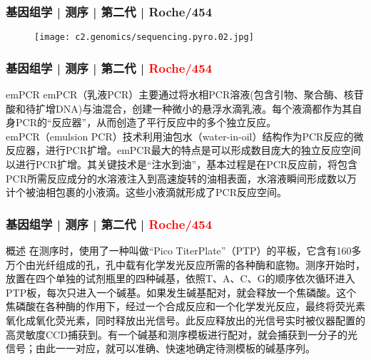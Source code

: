 \begin{frame}
  \frametitle{基因组学 | 测序 | 第二代 | Roche/454}
  \begin{figure}
    \centering
    \texttt{[image: c2.genomics/sequencing.pyro.02.jpg]}
  \end{figure}
\end{frame}

\begin{frame}
  \frametitle{基因组学 | 测序 | 第二代 | \textcolor{red}{Roche/454}}
  \begin{block}{emPCR}
emPCR（乳液PCR）主要通过将水相PCR溶液(包含引物、聚合酶、核苷酸和待扩增DNA)与油混合，创建一种微小的悬浮水滴乳液。每个液滴都作为其自身PCR的“反应器”，从而创造了平行反应中的多个独立反应。\\
\vspace{1em}
emPCR（emulsion PCR）技术利用油包水（water-in-oil）结构作为PCR反应的微反应器，进行PCR扩增。emPCR最大的特点是可以形成数目庞大的独立反应空间以进行PCR扩增。其关键技术是“注水到油”，基本过程是在PCR反应前，将包含PCR所需反应成分的水溶液注入到高速旋转的油相表面，水溶液瞬间形成数以万计个被油相包裹的小液滴。这些小液滴就形成了PCR反应空间。
  \end{block}
\end{frame}

\begin{frame}
  \frametitle{基因组学 | 测序 | 第二代 | \textcolor{red}{Roche/454}}
  \begin{block}{概述}
在测序时，使用了一种叫做“Pico TiterPlate”（PTP）的平板，它含有160多万个由光纤组成的孔，孔中载有化学发光反应所需的各种酶和底物。测序开始时，放置在四个单独的试剂瓶里的四种碱基，依照T、A、C、G的顺序依次循环进入PTP板，每次只进入一个碱基。如果发生碱基配对，就会释放一个焦磷酸。这个焦磷酸在各种酶的作用下，经过一个合成反应和一个化学发光反应，最终将荧光素氧化成氧化荧光素，同时释放出光信号。此反应释放出的光信号实时被仪器配置的高灵敏度CCD捕获到。有一个碱基和测序模板进行配对，就会捕获到一分子的光信号；由此一一对应，就可以准确、快速地确定待测模板的碱基序列。
  \end{block}
\end{frame}


